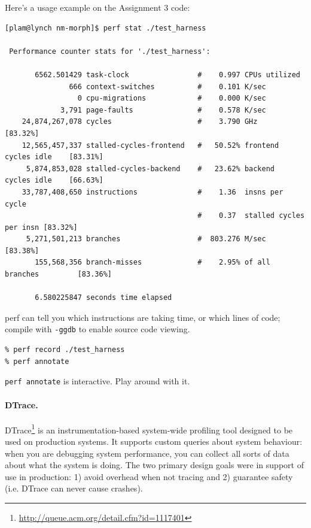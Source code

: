 \documentclass[11pt]{article}
\begin{document}
\noindent
Here's a usage example on the Assignment 3 code:
\begin{lstlisting}[basicstyle=\tiny]
[plam@lynch nm-morph]$ perf stat ./test_harness

 Performance counter stats for './test_harness':

       6562.501429 task-clock                #    0.997 CPUs utilized          
               666 context-switches          #    0.101 K/sec                  
                 0 cpu-migrations            #    0.000 K/sec                  
             3,791 page-faults               #    0.578 K/sec                  
    24,874,267,078 cycles                    #    3.790 GHz                     [83.32%]
    12,565,457,337 stalled-cycles-frontend   #   50.52% frontend cycles idle    [83.31%]
     5,874,853,028 stalled-cycles-backend    #   23.62% backend  cycles idle    [66.63%]
    33,787,408,650 instructions              #    1.36  insns per cycle        
                                             #    0.37  stalled cycles per insn [83.32%]
     5,271,501,213 branches                  #  803.276 M/sec                   [83.38%]
       155,568,356 branch-misses             #    2.95% of all branches         [83.36%]

       6.580225847 seconds time elapsed
\end{lstlisting} %

\noindent
perf can tell you which instructions are taking time, or which lines
of code; compile with {\tt -ggdb} to enable source code viewing.

\begin{lstlisting}
% perf record ./test_harness
% perf annotate
\end{lstlisting}

\noindent
{\tt perf annotate} is interactive. Play around with it.

\paragraph{DTrace.} 
DTrace\footnote{\url{http://queue.acm.org/detail.cfm?id=1117401}}\cite{Cantrill:2004:DIP:1247415.1247417} is an instrumentation-based
system-wide profiling tool designed to be used on production
systems. It supports custom queries about system behaviour: when you
are debugging system performance, you can collect all sorts of data
about what the system is doing. The two primary design goals were in
support of use in production: 1) avoid overhead when not tracing and
2) guarantee safety (i.e. DTrace can never cause crashes).
\end{document}
